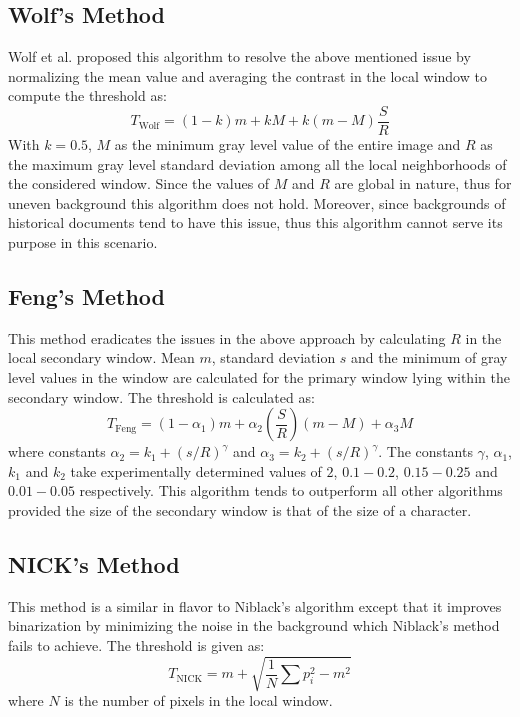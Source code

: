 \documentclass[conference]{IEEEtran}
\begin{document}
\subsection{Wolf's Method}
Wolf et al. \cite{wolf2003extraction} proposed this algorithm to resolve the above mentioned issue by normalizing the mean value and averaging the contrast in the local window to compute the threshold as:
\begin{equation}
T_{\text{Wolf}} = (1 - k)m + kM + k(m - M)\frac{S}{R}
\end{equation}
With $k = 0.5$, $M$ as the minimum gray level value of the entire image and $R$ as the maximum gray level standard deviation among all the local neighborhoods of the considered window. Since the values of $M$ and $R$ are global in nature, thus for uneven background this algorithm does not hold. Moreover, since backgrounds of historical documents tend to have this issue, thus this algorithm cannot serve its purpose in this scenario.

\subsection{Feng's Method}
This method \cite{feng2004contrast} eradicates the issues in the above approach by calculating $R$ in the local secondary window. Mean $m$, standard deviation $s$ and the minimum of gray level values in the window are calculated for the primary window lying within the secondary window. The threshold is calculated as:
\begin{equation}
T_{\text{Feng}} = (1 - \alpha_1) m + \alpha_2 \left(\frac{S}{R}\right)(m - M) + \alpha_3 M
\end{equation}
where constants $\alpha_2 = k_1 + (s/R)^\gamma$ and $\alpha_3 = k_2 + (s/R)^\gamma$. The constants $\gamma$, $\alpha_1$, $k_1$ and $k_2$ take experimentally determined values of $2$, $0.1-0.2$, $0.15-0.25$ and $0.01-0.05$ respectively. This algorithm tends to outperform all other algorithms provided the size of the secondary window is that of the size of a character.

\subsection{NICK's Method}
This method \cite{khurshid2009comparison} is a similar in flavor to Niblack's algorithm except that it improves binarization by minimizing the noise in the background which Niblack's method fails to achieve. The threshold is given as:
\begin{equation}
T_{\text{NICK}} = m + \sqrt{\frac{1}{N}\sum p_i^2 - m^2}
\end{equation}
where $N$ is the number of pixels in the local window.
\end{document}
